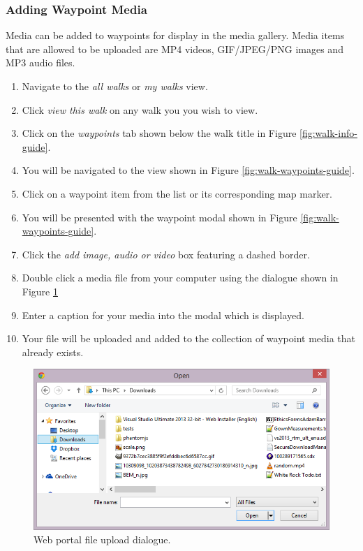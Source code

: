 \documentclass[11pt,a4paper]{report}
\begin{document}
\subsubsection{Adding Waypoint Media}

Media can be added to waypoints for display in the media gallery. Media items that are allowed to be uploaded are MP4 videos, GIF/JPEG/PNG images and MP3 audio files.

\begin{enumerate}
\item Navigate to the \emph{all walks} or \emph{my walks} view.
\item Click \emph{view this walk} on any walk you you wish to view.
\item Click on the \emph{waypoints} tab shown below the walk title in Figure \ref{fig:walk-info-guide}.
\item You will be navigated to the view shown in Figure \ref{fig:walk-waypoints-guide}.
\item Click on a waypoint item from the list or its corresponding map marker.
\item You will be presented with the waypoint modal shown in Figure \ref{fig:walk-waypoints-guide}.
\item Click the \emph{add image, audio or video} box featuring a dashed border.
\item Double click a media file from your computer using the dialogue shown in Figure \ref{fig:FileUpload}
\item Enter a caption for your media into the modal which is displayed.
\item Your file will be uploaded and added to the collection of waypoint media that already exists.
\end{enumerate}

\begin{figure}[h]
\centering
\includegraphics[width=0.7\linewidth]{./img/webportal-guide/FileUpload}
\caption{Web portal file upload dialogue.}
\label{fig:FileUpload}
\end{figure}
\end{document}
